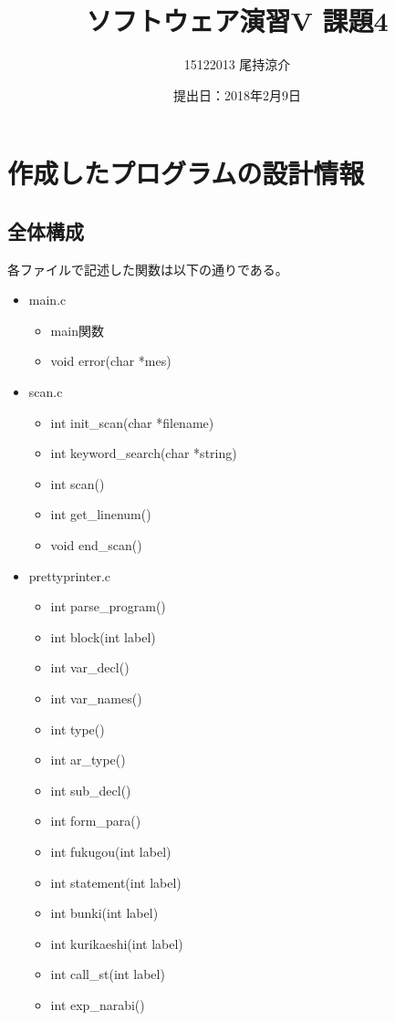 \documentclass{jarticle}
\title{ソフトウェア演習V 課題4}
\author{15122013 尾持涼介}
\date{提出日：2018年2月9日}
\makeatletter
\def\maketitle{%
\null
\thispagestyle{empty}%
\vfill
\begin{center}\leavevmode
\normalfont
{\LARGE \@title\par}%
\vskip 1cm
{\Large \@author\par}%
\vskip 1cm
{\Large \@date\par}%
\end{center}%
\vfill
\null
\@thanks%
\cleardoublepage
}
\makeatother
\begin{document}
\maketitle

\section{作成したプログラムの設計情報}
\subsection{全体構成}
各ファイルで記述した関数は以下の通りである。
\begin{itemize}
  \item main.c
  \begin{itemize}
    \item main関数
    \item void error(char *mes)
  \end{itemize}
  \item scan.c
  \begin{itemize}
    \item int init\_scan(char *filename)
    \item int keyword\_search(char *string)
    \item int scan()
    \item int get\_linenum()
    \item void end\_scan()
  \end{itemize}
  \item prettyprinter.c
  \begin{itemize}
    \item int parse\_program()
    \item int block(int label)
    \item int var\_decl()
    \item int var\_names()
    \item int type()
    \item int ar\_type()
    \item int sub\_decl()
    \item int form\_para()
    \item int fukugou(int label)
    \item int statement(int label)
    \item int bunki(int label)
    \item int kurikaeshi(int label)
    \item int call\_st(int label)
    \item int exp\_narabi()

\end{itemize}
\end{itemize}
\end{document}
